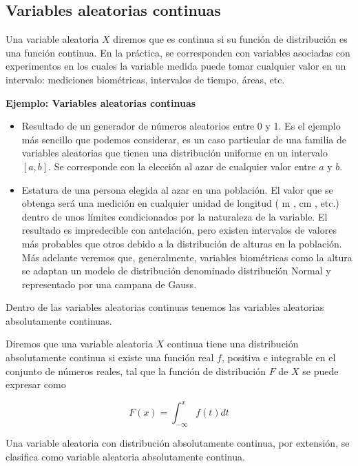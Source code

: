 \documentclass[
]{article}
\providecommand{\tightlist}{%
  \setlength{\itemsep}{0pt}\setlength{\parskip}{0pt}}
\begin{document}
\subsection{Variables aleatorias continuas}\label{variables-aleatorias-continuas-1}

Una variable aleatoria \(X\) diremos que es continua si su función de
distribución es una función continua. En la práctica, se corresponden
con variables asociadas con experimentos en los cuales la variable
medida puede tomar cualquier valor en un intervalo: mediciones
biométricas, intervalos de tiempo, áreas, etc.

\textbf{Ejemplo: Variables aleatorias continuas}

\begin{itemize}
\tightlist
\item
  Resultado de un generador de números aleatorios entre 0 y 1. Es el
  ejemplo más sencillo que podemos considerar, es un caso particular
  de una familia de variables aleatorias que tienen una distribución
  uniforme en un intervalo \([a, b]\). Se corresponde con la elección al
  azar de cualquier valor entre \(a\) y \(b\).
\item
  Estatura de una persona elegida al azar en una población. El valor
  que se obtenga será una medición en cualquier unidad de longitud ( m
  , cm , etc.) dentro de unos límites condicionados por la naturaleza
  de la variable. El resultado es impredecible con antelación, pero
  existen intervalos de valores más probables que otros debido a la
  distribución de alturas en la población. Más adelante veremos que,
  generalmente, variables biométricas como la altura se adaptan un
  modelo de distribución denominado distribución Normal y representado
  por una campana de Gauss.
\end{itemize}

Dentro de las variables aleatorias continuas tenemos las variables
aleatorias absolutamente continuas.

Diremos que una variable aleatoria \(X\) continua tiene una distribución
absolutamente continua si existe una función real \(f\), positiva e
integrable en el conjunto de números reales, tal que la función de
distribución \(F\) de \(X\) se puede expresar como

\[
F(x)=\int_{-\infty}^{x} f(t) d t
\]

Una variable aleatoria con distribución absolutamente continua, por
extensión, se clasifica como variable aleatoria absolutamente continua.
\end{document}

